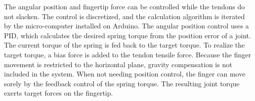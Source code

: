 \documentclass{llncs}
\begin{document}
The angular position and fingertip force can be controlled while the tendons do not slacken.
The control is discretized, and the calculation algorithm is iterated by the micro-computer installed on Arduino.
The angular position control uses a PID, which calculates the desired spring torque from the position error of a joint.
The current torque of the spring is fed back to the target torque.
To realize the target torque, a bias force is added to the tendon tensile force.
Because the finger movement is restricted to the horizontal plane, gravity compensation is not included in the system.
When not needing position control, the finger can move sorely by the feedback control of the spring torque.
The resulting joint torque exerts target forces on the fingertip.

\end{document}
